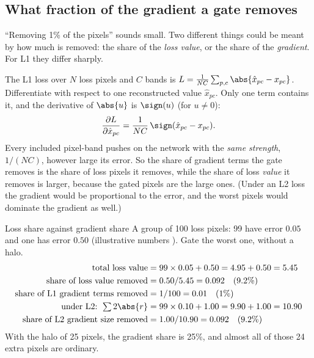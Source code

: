 \subsection{What fraction of the gradient a gate removes}\label{sec:decoderwork:gradfrac}

``Removing 1\% of the pixels'' sounds small. Two different things could be meant by how much is removed: the
share of the \emph{loss value}, or the share of the \emph{gradient}. For L1 they differ sharply.

The L1 loss over $N$ loss pixels and $C$ bands is $L=\frac{1}{NC}\sum_{p,c}\abs{\hat x_{pc}-x_{pc}}$.
Differentiate with respect to one reconstructed value $\hat x_{pc}$. Only one term contains it, and the
derivative of $\abs{u}$ is $\sign(u)$ (for $u\ne0$):
\begin{equation}\label{eq:decoderwork:l1grad}
\frac{\partial L}{\partial\hat x_{pc}} = \frac{1}{NC}\,\sign(\hat x_{pc}-x_{pc}).
\end{equation}
Every included pixel-band pushes on the network with the \emph{same strength}, $1/(NC)$, however large its
error. So the share of gradient terms the gate removes is the share of loss pixels it removes, while the share
of loss \emph{value} it removes is larger, because the gated pixels are the large ones. (Under an L2 loss the
gradient would be proportional to the error, and the worst pixels would dominate the gradient as well.)

\begin{worked}[label={we:decoderwork:share}]{Loss share against gradient share}
A group of 100 loss pixels: 99 have error $0.05$ and one has error $0.50$ (illustrative numbers \tagA). Gate
the worst one, without a halo.
\begin{align*}
\text{total loss value} &= 99\times0.05 + 0.50 = 4.95 + 0.50 = 5.45\\
\text{share of loss value removed} &= 0.50/5.45 = 0.092 \quad(9.2\%)\\
\text{share of L1 gradient terms removed} &= 1/100 = 0.01 \quad(1\%)\\
\text{under L2: } \textstyle\sum 2\abs{r} &= 99\times0.10 + 1.00 = 9.90+1.00 = 10.90\\
\text{share of L2 gradient size removed} &= 1.00/10.90 = 0.092 \quad(9.2\%)
\end{align*}
With the halo of 25 pixels, the gradient share is 25\%, and almost all of those 24 extra pixels are ordinary.
\end{worked}

